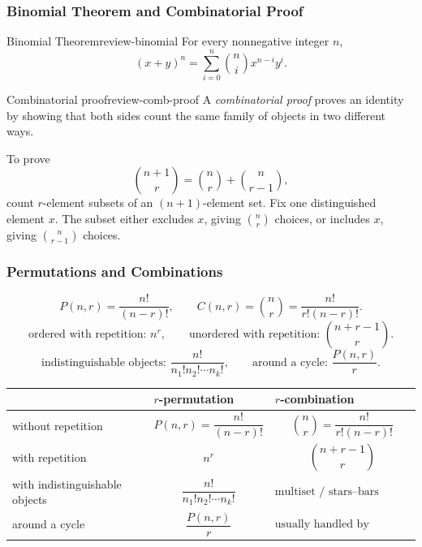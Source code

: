 \subsubsection{Binomial Theorem and Combinatorial Proof}

\begin{theorem}{Binomial Theorem}{review-binomial}
For every nonnegative integer \(n\),
\[
(x+y)^n
=
\sum_{i=0}^{n}\binom{n}{i}x^{n-i}y^i.
\]
\end{theorem}

\begin{definition}{Combinatorial proof}{review-comb-proof}
A \emph{combinatorial proof} proves an identity by showing that both sides count the same family of objects in two different ways.
\end{definition}

\begin{examplebox}[title={Pascal identity by counting}]
To prove
\[
\binom{n+1}{r}=\binom{n}{r}+\binom{n}{r-1},
\]
count \(r\)-element subsets of an \((n+1)\)-element set. Fix one distinguished element \(x\). The subset either excludes \(x\), giving \(\binom{n}{r}\) choices, or includes \(x\), giving \(\binom{n}{r-1}\) choices.
\end{examplebox}

\subsubsection{Permutations and Combinations}

\begin{keyformula}[title={Core permutation and combination formulas}]
\[
P(n,r)=\frac{n!}{(n-r)!},
\qquad
C(n,r)=\binom{n}{r}=\frac{n!}{r!(n-r)!}.
\]
\[
\text{ordered with repetition: }n^r,
\qquad
\text{unordered with repetition: }\binom{n+r-1}{r}.
\]
\[
\text{indistinguishable objects: }
\frac{n!}{n_1!n_2!\cdots n_k!},
\qquad
\text{around a cycle: }
\frac{P(n,r)}{r}.
\]
\end{keyformula}

\begin{center}
\small
\begin{tabular}{@{}p{}p{}p{}@{}}
\toprule
& \textbf{\(r\)-permutation} & \textbf{\(r\)-combination} \\
\midrule
without repetition &
\[
P(n,r)=\frac{n!}{(n-r)!}
\]
&
\[
\binom{n}{r}=\frac{n!}{r!(n-r)!}
\]
\\[1em]
with repetition &
\[
n^r
\]
&
\[
\binom{n+r-1}{r}
\]
\\[1em]
with indistinguishable objects &
\[
\frac{n!}{n_1!n_2!\cdots n_k!}
\]
&
\[
\text{multiset / stars--bars model}
\]
\\[1em]
around a cycle &
\[
\frac{P(n,r)}{r}
\]
&
\[
\text{usually handled by symmetry}
\]
\\
\bottomrule
\end{tabular}
\end{center}

